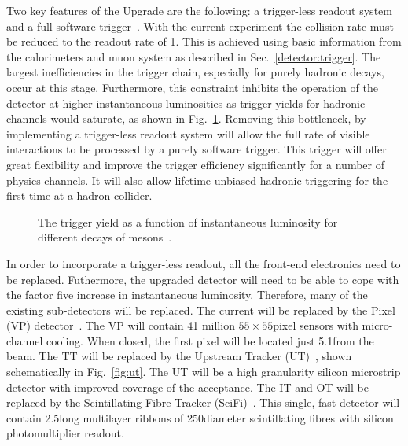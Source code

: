 Two key features of the \lhcb Upgrade are the following: a trigger-less readout system and a full software trigger~\cite{upgrade-trigger-tdr}. With the current experiment the collision rate must be reduced to the readout rate of 1\mhz. This is achieved using basic information from the calorimeters and muon system as described in Sec.~\ref{detector:trigger}. The largest inefficiencies in the trigger chain, especially for purely hadronic decays, occur at this stage. Furthermore, this constraint inhibits the operation of the detector at higher instantaneous luminosities as trigger yields for hadronic channels would saturate, as shown in Fig.~\ref{fig:upgrade-motivation}. Removing this bottleneck, by implementing a trigger-less readout system will allow the full rate of visible interactions to be processed by a purely software trigger. This trigger will offer great flexibility and improve the trigger efficiency significantly for a number of physics channels. It will also allow lifetime unbiased hadronic triggering for the first time at a hadron collider.

\begin{figure}[!tb]
\centering
{}
\caption{The trigger yield as a function of instantaneous luminosity for different decays of \B mesons~\cite{upgrade-loi}.}
\label{fig:upgrade-motivation}
\end{figure}

In order to incorporate a trigger-less readout, all the front-end electronics need to be replaced. Futhermore, the upgraded detector will need to be able to cope with the factor five increase in instantaneous luminosity. Therefore, many of the existing sub-detectors will be replaced. The current \velo will be replaced by the \velo Pixel (VP) detector~\cite{upgrade-velo-tdr}. The VP will contain 41 million $55\times55$\mum pixel sensors with micro-channel \cotwo cooling. When closed, the first pixel will be located just 5.1\mm from the \lhcb beam. The TT will be replaced by the Upstream Tracker (UT)~\cite{upgrade-tracker-tdr}, shown schematically in Fig.~\ref{fig:ut}. The UT will be a high granularity silicon microstrip detector with improved coverage of the \lhcb acceptance. The IT and OT will be replaced by the Scintillating Fibre Tracker (SciFi)~\cite{upgrade-tracker-tdr}. This single, fast detector will contain 2.5\m long multilayer ribbons of 250\mum diameter scintillating fibres with silicon photomultiplier readout.


